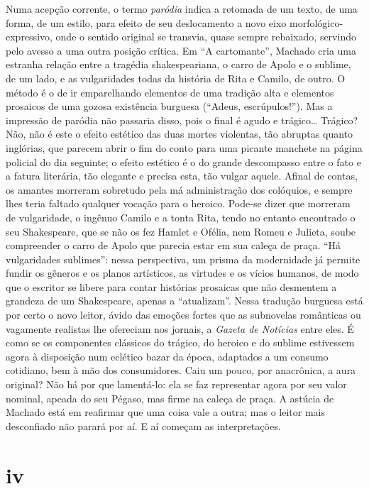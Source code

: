 Numa acepção corrente, o termo \emph{paródia} indica a retomada de um
texto, de uma forma, de um estilo, para efeito de seu deslocamento a
novo eixo morfológico-expressivo, onde o sentido original se transvia,
quase sempre rebaixado, servindo pelo avesso a uma outra posição
crítica. Em ``A cartomante'', Machado cria uma estranha relação entre a
tragédia shakespeariana, o carro de Apolo e o sublime, de um lado, e as
vulgaridades todas da história de Rita e Camilo, de outro. O método é o
de ir emparelhando elementos de uma tradição alta e elementos prosaicos
de uma gozosa existência burguesa (``Adeus, escrúpulos!''). Mas a
impressão de paródia não passaria disso, pois o final é agudo e
trágico\ldots{} Trágico? Não, não é este o efeito estético das duas
mortes violentas, tão abruptas quanto inglórias, que parecem abrir o fim
do conto para uma picante manchete na página policial do dia seguinte; o
efeito estético é o do grande descompasso entre o fato e a fatura
literária, tão elegante e precisa esta, tão vulgar aquele. Afinal de
contas, os amantes morreram sobretudo pela má administração dos
colóquios, e sempre lhes teria faltado qualquer vocação para o heroico.
Pode-se dizer que morreram de vulgaridade, o ingênuo Camilo e a tonta
Rita, tendo no entanto encontrado o seu Shakespeare, que se não os fez
Hamlet e Ofélia, nem Romeu e Julieta, soube compreender o carro de Apolo
que parecia estar em sua caleça de praça. ``Há vulgaridades sublimes'':
nessa perspectiva, um prisma da modernidade já permite fundir os gêneros
e os planos artísticos, as virtudes e os vícios humanos, de modo que o
escritor se libere para contar histórias prosaicas que não desmentem a
grandeza de um Shakespeare, apenas a ``atualizam''. Nessa tradução
burguesa está por certo o novo leitor, ávido das emoções fortes que as
subnovelas românticas ou vagamente realistas lhe ofereciam nos jornais,
a \emph{Gazeta de Notícias} entre eles. É como se os componentes
clássicos do trágico, do heroico e do sublime estivessem agora à
disposição num eclético bazar da época, adaptados a um consumo
cotidiano, bem à mão dos consumidores. Caiu um pouco, por anacrônica, a
aura original? Não há por que lamentá-lo: ela se faz representar agora
por seu valor nominal, apeada do seu Pégaso, mas firme na caleça de
praça. A astúcia de Machado está em reafirmar que uma coisa vale a
outra; mas o leitor mais desconfiado não parará por aí. E aí começam as
interpretações.

\section*{iv}

